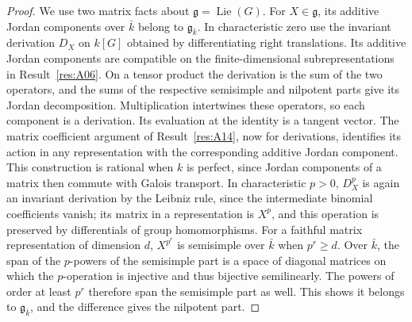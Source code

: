\documentclass[11pt,a4paper,openany,oneside]{book}
\theoremstyle{resultstyle}
\theoremstyle{definition}
\numberwithin{equation}{chapter}
\DeclareMathOperator{\Lie}{Lie}
\begin{document}
\begin{proof}
We use two matrix facts about \(\mathfrak g=\Lie(G)\).
For \(X\in\mathfrak g\), its additive Jordan components over
\(\bar k\) belong to \(\mathfrak g_{\bar k}\). In characteristic
zero use the invariant derivation \(D_X\) on \(k[G]\) obtained
by differentiating right translations. Its additive Jordan
components are compatible on the finite-dimensional
subrepresentations in Result~\ref{res:A06}. On a tensor
product the derivation is the sum of the two operators, and
the sums of the respective semisimple and nilpotent parts
give its Jordan decomposition. Multiplication intertwines
these operators, so each component is a derivation. Its
evaluation at the identity is a tangent vector. The matrix
coefficient argument of Result~\ref{res:A14}, now for
derivations, identifies its action in any representation
with the corresponding additive Jordan component.
This construction is rational when \(k\) is perfect, since
Jordan components of a matrix then commute with Galois
transport. In characteristic \(p>0\), \(D_X^p\) is again
an invariant derivation by the Leibniz rule, since the
intermediate binomial coefficients vanish; its matrix in
a representation is \(X^p\), and this operation is
preserved by differentials of group homomorphisms.
For a faithful matrix representation of dimension \(d\),
\(X^{p^r}\) is semisimple over \(\bar k\) when \(p^r\ge d\).
Over \(\bar k\), the span of the \(p\)-powers of the
semisimple part is a space of diagonal matrices on which
the \(p\)-operation is injective and thus bijective
semilinearly. The powers of order at least \(p^r\) therefore
span the semisimple part as well. This shows it belongs to
\(\mathfrak g_{\bar k}\), and the difference gives the
nilpotent part.


\end{proof}
\end{document}
